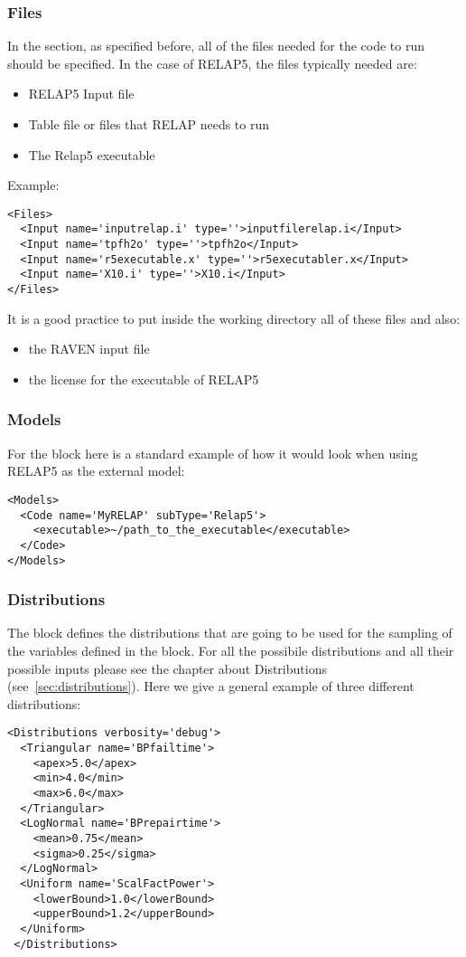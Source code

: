 \subsubsection{Files}
In the  section, as specified before, all of the files needed for
the code to run should be specified.
%
In the case of RELAP5, the files typically needed are:
\begin{itemize}
  \item RELAP5 Input file
  \item Table file or files that RELAP needs to run
  \item The Relap5 executable
\end{itemize}
Example:
\begin{lstlisting}[style=XML]
<Files>
  <Input name='inputrelap.i' type=''>inputfilerelap.i</Input>
  <Input name='tpfh2o' type=''>tpfh2o</Input>
  <Input name='r5executable.x' type=''>r5executabler.x</Input>
  <Input name='X10.i' type=''>X10.i</Input>
</Files>
\end{lstlisting}

It is a good practice to put inside the working directory all of these files and
also:
\begin{itemize}
  \item the RAVEN input file
  \item the license for the executable of RELAP5
\end{itemize}
\subsubsection{Models}
For the  block here is a standard example of how it would look
when using RELAP5 as the external model:
\begin{lstlisting}[style=XML]
<Models>
  <Code name='MyRELAP' subType='Relap5'>
    <executable>~/path_to_the_executable</executable>
  </Code>
</Models>
\end{lstlisting}
\subsubsection{Distributions}
The  block defines the distributions that are going
to be used for the sampling of the variables defined in the 
block.
%
For all the possibile distributions and all their possible inputs please see the
chapter about Distributions (see~\ref{sec:distributions}).
%
Here we give a general example of three different distributions:
\begin{lstlisting}[style=XML,morekeywords={name,debug}]
<Distributions verbosity='debug'>
  <Triangular name='BPfailtime'>
    <apex>5.0</apex>
    <min>4.0</min>
    <max>6.0</max>
  </Triangular>
  <LogNormal name='BPrepairtime'>
    <mean>0.75</mean>
    <sigma>0.25</sigma>
  </LogNormal>
  <Uniform name='ScalFactPower'>
    <lowerBound>1.0</lowerBound>
    <upperBound>1.2</upperBound>
  </Uniform>
 </Distributions>
\end{lstlisting}

